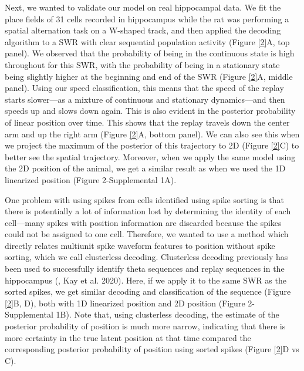 \documentclass[times, twoside]{zHenriquesLab-StyleBioRxiv}
\begin{document}
Next, we wanted to validate our model on real hippocampal data. We fit the place fields of 31 cells recorded in hippocampus while the rat was performing a spatial alternation task on a W-shaped track, and then applied the decoding algorithm to a SWR with clear sequential population activity (Figure \ref{2}A, top panel). We observed that the probability of being in the continuous state is high throughout for this SWR, with the probability of being in a stationary state being slightly higher at the beginning and end of the SWR (Figure \ref{2}A, middle panel). Using our speed classification, this means that the speed of the replay starts slower---as a mixture of continuous and stationary dynamics---and then speeds up and slows down again. This is also evident in the posterior probability of linear position over time. This shows that the replay travels down the center arm and up the right arm (Figure \ref{2}A, bottom panel). We can also see this when we project the maximum of the posterior of this trajectory to 2D (Figure \ref{2}C) to better see the spatial trajectory. Moreover, when we apply the same model using the 2D position of the animal, we get a similar result as when we used the 1D linearized position (Figure 2-Supplemental 1A).

One problem with using spikes from cells identified using spike sorting is that there is potentially a lot of information lost by determining the identity of each cell---many spikes with position information are discarded because the spikes could not be assigned to one cell. Therefore, we wanted to use a method which directly relates multiunit spike waveform features to position without spike sorting, which we call clusterless decoding. Clusterless decoding previously has been used to successfully identify theta sequences and replay sequences in the hippocampus (\cite{KloostermanBayesiandecodingusing2014, ChenTransductiveneuraldecoding2012,DengRapidclassificationhippocampal2016}, Kay et al. 2020). Here, if we apply it to the same SWR as the sorted spikes, we get similar decoding and classification of the sequence (Figure \ref{2}B, D), both with 1D linearized position and 2D position (Figure 2-Supplemental 1B). Note that, using clusterless decoding, the estimate of the posterior probability of position is much more narrow, indicating that there is more certainty in the true latent position at that time compared the corresponding posterior probability of position using sorted spikes (Figure \ref{2}D vs C).
\end{document}
